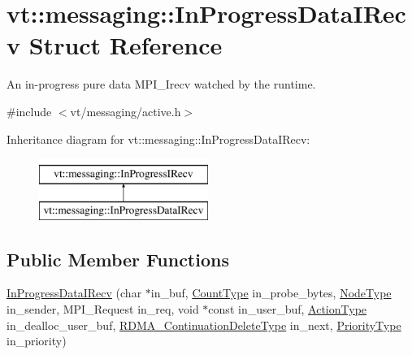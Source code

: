 \hypertarget{structvt_1_1messaging_1_1_in_progress_data_i_recv}{}\section{vt\+:\+:messaging\+:\+:In\+Progress\+Data\+I\+Recv Struct Reference}
\label{structvt_1_1messaging_1_1_in_progress_data_i_recv}


An in-\/progress pure data M\+P\+I\+\_\+\+Irecv watched by the runtime.  




{\ttfamily \#include $<$vt/messaging/active.\+h$>$}

Inheritance diagram for vt\+:\+:messaging\+:\+:In\+Progress\+Data\+I\+Recv\+:\begin{figure}[H]
\begin{center}
\leavevmode
\includegraphics[height=2.000000cm]{structvt_1_1messaging_1_1_in_progress_data_i_recv}
\end{center}
\end{figure}
\subsection*{Public Member Functions}
\begin{DoxyCompactItemize}
\item 
\hyperlink{structvt_1_1messaging_1_1_in_progress_data_i_recv_a3438000780af9166527368c65284d0ee}{In\+Progress\+Data\+I\+Recv} (char $\ast$in\+\_\+buf, \hyperlink{structvt_1_1messaging_1_1_in_progress_i_recv_a2a3824ca08dcfc5a3278882c1df8edd6}{Count\+Type} in\+\_\+probe\+\_\+bytes, \hyperlink{namespacevt_a866da9d0efc19c0a1ce79e9e492f47e2}{Node\+Type} in\+\_\+sender, M\+P\+I\+\_\+\+Request in\+\_\+req, void $\ast$const in\+\_\+user\+\_\+buf, \hyperlink{namespacevt_ae0a5a7b18cc99d7b732cb4d44f46b0f3}{Action\+Type} in\+\_\+dealloc\+\_\+user\+\_\+buf, \hyperlink{namespacevt_a4dfad0b5809d9812d60a0311a45ae0c2}{R\+D\+M\+A\+\_\+\+Continuation\+Delete\+Type} in\+\_\+next, \hyperlink{namespacevt_a86bff9f556eb761b27fc8600d006ac04}{Priority\+Type} in\+\_\+priority)
\end{DoxyCompactItemize}
